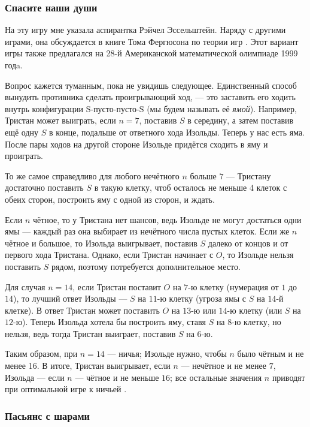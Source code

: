 \subsubsection*{Спасите наши души}

На эту игру мне указала аспирантка Рэйчел Эссельштейн.
Наряду с другими играми, она обсуждается в книге Тома Фергюсона по теории игр \cite{ferguson}.
Этот вариант игры также предлагался на 28-й Американской математической олимпиаде 1999 годa.

Вопрос кажется туманным, пока не увидишь следующее.
Единственный способ вынудить противника сделать проигрывающий ход, --- это заставить его ходить внутрь конфигурации S-пусто-пусто-S (мы будем называть её \emph{ямой}).
Например, Тристан может выиграть, если $n = 7$, поставив $S$ в середину, а затем поставив ещё одну $S$ в конце, подальше от ответного хода Изольды.
Теперь у нас есть яма.
После пары ходов на другой стороне Изольде придётся сходить в яму и проиграть.

То же самое справедливо для любого нечётного $n$ больше $7$ --- Тристану достаточно поставить $S$ в такую клетку, чтоб осталось не меньше 4 клеток с обеих сторон, построить яму с одной из сторон, и ждать.

Если $n$ чётное, то у Тристана нет шансов, ведь Изольде не могут достаться одни ямы --- каждый раз она выбирает из нечётного числа пустых клеток.
Если же $n$ чётное и большое, то Изольда выигрывает, поставив $S$ далеко от концов и от первого хода Тристана.
Однако, если Тристан начинает с $O$, то Изольде нельзя поставить $S$ рядом, поэтому потребуется дополнительное место.

Для случая $n = 14$, если Тристан поставит $O$ на $7$-ю клетку (нумерация от $1$ до $14$), то лучший ответ Изольды --- $S$ на $11$-ю клетку (угроза ямы с $S$ на $14$-й клетке).
В ответ Тристан может поставить $O$ на $13$-ю или $14$-ю клетку (или $S$ на $12$-ю). 
Теперь Изольда хотела бы построить яму, ставя $S$ на $8$-ю клетку, но нельзя, ведь тогда Тристан выиграет, поставив $S$ на $6$-ю.

Таким образом, при $n = 14$ --- ничья;
Изольде нужно, чтобы $n$ было чётным и не менее 16.
В итоге, Тристан выигрывает, если $n$ --- нечётное и не менее $7$,
Изольда --- если $n$ --- чётное и не меньше $16$;
все остальные значения $n$ приводят при оптимальной игре к ничьей .

\subsubsection*{Пасьянс с шарами}

